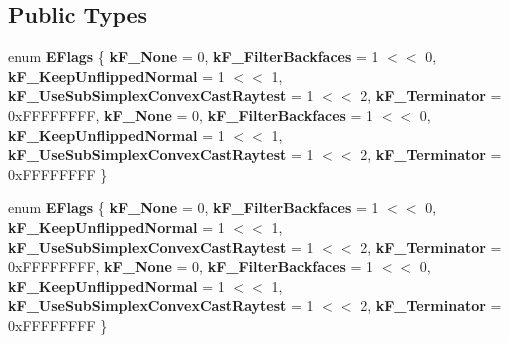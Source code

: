 \subsection*{Public Types}
\begin{DoxyCompactItemize}
\item 
\mbox{\label{classbtTriangleRaycastCallback_a561b385fd82b6b972fb6d206a42fc478}} 
enum {\bfseries E\+Flags} \{ \newline
{\bfseries k\+F\+\_\+\+None} = 0, 
{\bfseries k\+F\+\_\+\+Filter\+Backfaces} = 1 $<$$<$ 0, 
{\bfseries k\+F\+\_\+\+Keep\+Unflipped\+Normal} = 1 $<$$<$ 1, 
{\bfseries k\+F\+\_\+\+Use\+Sub\+Simplex\+Convex\+Cast\+Raytest} = 1 $<$$<$ 2, 
\newline
{\bfseries k\+F\+\_\+\+Terminator} = 0x\+F\+F\+F\+F\+F\+F\+FF, 
{\bfseries k\+F\+\_\+\+None} = 0, 
{\bfseries k\+F\+\_\+\+Filter\+Backfaces} = 1 $<$$<$ 0, 
{\bfseries k\+F\+\_\+\+Keep\+Unflipped\+Normal} = 1 $<$$<$ 1, 
\newline
{\bfseries k\+F\+\_\+\+Use\+Sub\+Simplex\+Convex\+Cast\+Raytest} = 1 $<$$<$ 2, 
{\bfseries k\+F\+\_\+\+Terminator} = 0x\+F\+F\+F\+F\+F\+F\+FF
 \}
\item 
\mbox{\label{classbtTriangleRaycastCallback_a561b385fd82b6b972fb6d206a42fc478}} 
enum {\bfseries E\+Flags} \{ \newline
{\bfseries k\+F\+\_\+\+None} = 0, 
{\bfseries k\+F\+\_\+\+Filter\+Backfaces} = 1 $<$$<$ 0, 
{\bfseries k\+F\+\_\+\+Keep\+Unflipped\+Normal} = 1 $<$$<$ 1, 
{\bfseries k\+F\+\_\+\+Use\+Sub\+Simplex\+Convex\+Cast\+Raytest} = 1 $<$$<$ 2, 
\newline
{\bfseries k\+F\+\_\+\+Terminator} = 0x\+F\+F\+F\+F\+F\+F\+FF, 
{\bfseries k\+F\+\_\+\+None} = 0, 
{\bfseries k\+F\+\_\+\+Filter\+Backfaces} = 1 $<$$<$ 0, 
{\bfseries k\+F\+\_\+\+Keep\+Unflipped\+Normal} = 1 $<$$<$ 1, 
\newline
{\bfseries k\+F\+\_\+\+Use\+Sub\+Simplex\+Convex\+Cast\+Raytest} = 1 $<$$<$ 2, 
{\bfseries k\+F\+\_\+\+Terminator} = 0x\+F\+F\+F\+F\+F\+F\+FF
 \}
\end{DoxyCompactItemize}
